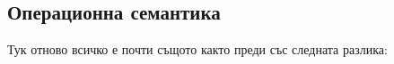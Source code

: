 




\subsection{Операционна семантика}


Тук отново всичко е почти същото както преди със следната разлика:

